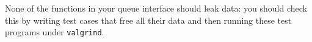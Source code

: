 \documentclass[12pt]{exam}
\begin{document}
None of the functions in your queue interface should leak data: you
should check this by writing test cases that free all their data and
then running these test programs under \lstinline'valgrind'.





\end{document}
